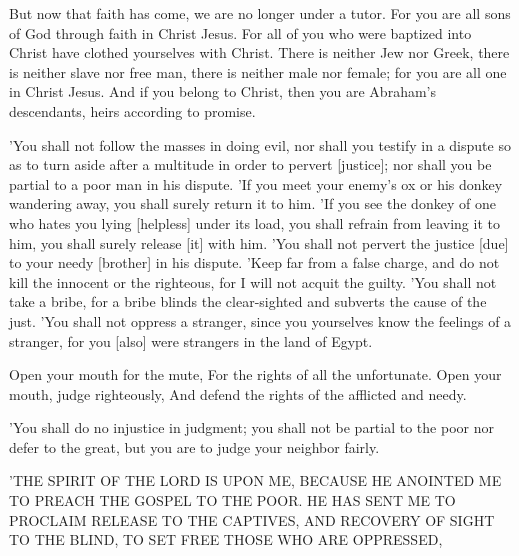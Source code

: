 \begin{scripture}[Galatians 3:25-30]
    But now that faith has come, we are no longer under a tutor.
    For you are all sons of God through faith in Christ Jesus.
    For all of you who were baptized into Christ have clothed yourselves with Christ.
    There is neither Jew nor Greek, there is neither slave nor free man, there is neither male nor female; for you are all one in Christ Jesus.
    And if you belong to Christ, then you are Abraham's descendants, heirs according to promise.
\end{scripture}

\begin{scripture}[Exodus 23:2-9]
    'You shall not follow the masses in doing evil, nor shall you testify in a dispute so as to turn aside after a multitude in order to pervert [justice];
    nor shall you be partial to a poor man in his dispute.
    'If you meet your enemy's ox or his donkey wandering away, you shall surely return it to him.
    'If you see the donkey of one who hates you lying [helpless] under its load, you shall refrain from leaving it to him, you shall surely release [it] with him.
    'You shall not pervert the justice [due] to your needy [brother] in his dispute.
    'Keep far from a false charge, and do not kill the innocent or the righteous, for I will not acquit the guilty.
    'You shall not take a bribe, for a bribe blinds the clear-sighted and subverts the cause of the just.
    'You shall not oppress a stranger, since you yourselves know the feelings of a stranger, for you [also] were strangers in the land of Egypt.
\end{scripture}

\begin{scripture}[Proverbs 31:8-9]
    Open your mouth for the mute, For the rights of all the unfortunate.
    Open your mouth, judge righteously, And defend the rights of the afflicted and needy.
\end{scripture}

\begin{scripture}[Leviticus 19:15]
    'You shall do no injustice in judgment; you shall not be partial to the poor nor defer to the great, but you are to judge your neighbor fairly.
\end{scripture}

\begin{scripture}[Luke 4:18]
    'THE SPIRIT OF THE LORD IS UPON ME, BECAUSE HE ANOINTED ME TO PREACH THE GOSPEL TO THE POOR. HE HAS SENT ME TO PROCLAIM RELEASE TO THE CAPTIVES, AND RECOVERY OF SIGHT TO THE BLIND, TO SET FREE THOSE WHO ARE OPPRESSED,
\end{scripture}

